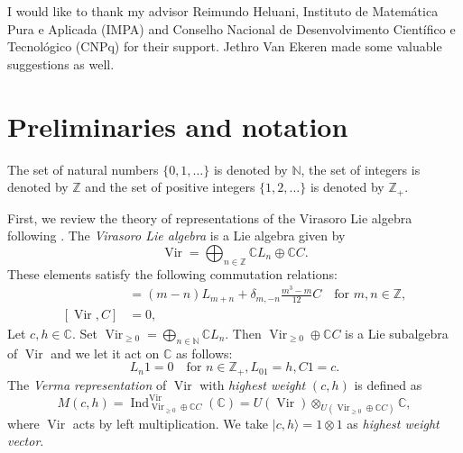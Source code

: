 \documentclass[a4paper, 12pt, reqno]{amsart}
\theoremstyle{remark}
\DeclareMathOperator{\Vir}{Vir}
\DeclareMathOperator{\Ind}{Ind}
\begin{document}
I would like to thank my advisor Reimundo Heluani, Instituto de Matemática Pura e Aplicada (IMPA) and Conselho Nacional de Desenvolvimento Científico e Tecnológico (CNPq) for their support.
Jethro Van Ekeren made some valuable suggestions as well.

\section{Preliminaries and notation}
\label{sec:prel-notat}

The set of natural numbers $\{0, 1, \dots\}$ is denoted by $\mathbb{N}$, the set of integers is denoted by $\mathbb{Z}$ and the set of positive integers $\{1, 2, \dots\}$ is denoted by $\mathbb{Z}_+$.

First, we review the theory of representations of the Virasoro Lie algebra following \cite{kac_bombay_2013}.
The \emph{Virasoro Lie algebra} is a Lie algebra given by
\begin{equation*}
  \Vir = \bigoplus_{n \in \mathbb{Z}}\mathbb{C}L_n \oplus \mathbb{C}C.
\end{equation*}
These elements satisfy the following commutation relations:
\begin{align*}
  [L_m, L_n] &= (m - n)L_{m + n} + \delta_{m, -n}\frac{m^3 - m}{12}C \quad \text{for }m, n \in \mathbb{Z}, \\
  [\Vir, C] &= 0,
\end{align*}
Let $c, h \in \mathbb{C}$.
Set $\Vir_{\ge 0} = \bigoplus_{n \in \mathbb{N}}\mathbb{C}L_n$.
Then $\Vir_{\ge 0} \oplus \mathbb{C}C$ is a Lie subalgebra of $\Vir$ and we let it act on $\mathbb{C}$ as follows:
\begin{equation*}
  L_n1 = 0 \quad \text{for }n \in \mathbb{Z}_+, L_01 = h, C1 = c.
\end{equation*}
The \emph{Verma representation} of $\Vir$ with \emph{highest weight} $(c, h)$ is defined as
\begin{equation*}
  M(c, h) = \Ind^{\Vir}_{\Vir_{\ge 0} \oplus \mathbb{C}C}(\mathbb{C}) = U(\Vir) \otimes_{U(\Vir_{\ge 0} \oplus \mathbb{C}C)} \mathbb{C},
\end{equation*}
where $\Vir$ acts by left multiplication.
We take $|c, h\rangle = 1 \otimes 1$ as \emph{highest weight vector}.
\end{document}
